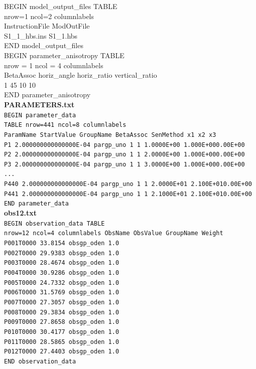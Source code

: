 \documentclass[11pt,oneside,onecolumn]{usgsreport}
\begin{document}
\begin{appendix}
\begin{bibunit}
{BEGIN model\_output\_files TABLE\\
nrow=1 ncol=2 columnlabels\\
InstructionFile ModOutFile\\
S1\_1\_hbs.ins S1\_1.hbs \\
END model\_output\_files \\
BEGIN parameter\_anisotropy TABLE\\
nrow = 1 ncol = 4 columnlabels \\
BetaAssoc horiz\_angle horiz\_ratio vertical\_ratio \\
1 45 10 10 \\
END parameter\_anisotropy}
\\
\textbf{PARAMETERS.txt} \\
\texttt{BEGIN parameter\_data \\
TABLE nrow=441 ncol=8 columnlabels \\
ParamName StartValue GroupName BetaAssoc SenMethod x1 x2 x3 \\
P1 2.000000000000000E-04 pargp\_uno 1 1 1.0000E+00 1.000E+000.00E+00 \\
P2 2.000000000000000E-04 pargp\_uno 1 1 2.0000E+00 1.000E+000.00E+00 \\
P3 2.000000000000000E-04 pargp\_uno 1 1 3.0000E+00 1.000E+000.00E+00\\
...\\
P440 2.000000000000000E-04 pargp\_uno 1 1 2.0000E+01 2.100E+010.00E+00 \\
P441 2.000000000000000E-04 pargp\_uno 1 1 2.1000E+01 2.100E+010.00E+00 \\
END parameter\_data}
\\

\textbf{obs12.txt} \\
\texttt{BEGIN observation\_data TABLE \\
nrow=12 ncol=4 columnlabels ObsName ObsValue GroupName Weight \\
P001T0000 33.8154 obsgp\_oden 1.0 \\
P002T0000 29.9383 obsgp\_oden 1.0 \\
P003T0000 28.4674 obsgp\_oden 1.0 \\
P004T0000 30.9286 obsgp\_oden 1.0 \\
P005T0000 24.7332 obsgp\_oden 1.0 \\
P006T0000 31.5769 obsgp\_oden 1.0 \\
P007T0000 27.3057 obsgp\_oden 1.0 \\
P008T0000 29.3834 obsgp\_oden 1.0 \\
P009T0000 27.8658 obsgp\_oden 1.0 \\
P010T0000 30.4177 obsgp\_oden 1.0 \\
P011T0000 28.5865 obsgp\_oden 1.0 \\
P012T0000 27.4403 obsgp\_oden 1.0 } \\
\texttt{END observation\_data \pagebreak{}}


\end{bibunit}
\end{appendix}
\end{document}
